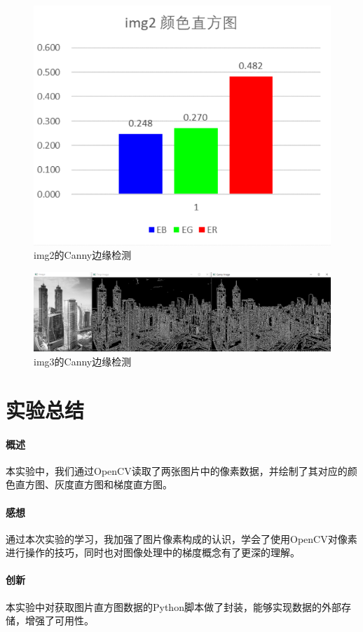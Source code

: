 \documentclass{article}
\begin{document}
\begin{figure}[htbp]
\centering
\includegraphics[width=13.5cm]{img/1-2.png}
\caption{img2的Canny边缘检测}
\label{2}
\end{figure}

\begin{figure}[htbp]
\centering
\includegraphics[width=13.5cm]{img/1-3.png}
\caption{img3的Canny边缘检测}
\label{2}
\end{figure}

\section{实验总结}
\paragraph{概述}
本实验中，我们通过OpenCV读取了两张图片中的像素数据，并绘制了其对应的颜色直方图、灰度直方图和梯度直方图。

\paragraph{感想}
通过本次实验的学习，我加强了图片像素构成的认识，学会了使用OpenCV对像素进行操作的技巧，同时也对图像处理中的梯度概念有了更深的理解。

\paragraph{创新}
本实验中对获取图片直方图数据的Python脚本做了封装，能够实现数据的外部存储，增强了可用性。
\end{document}

